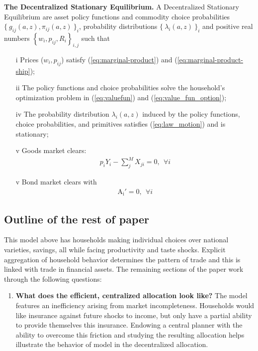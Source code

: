 \documentclass[12pt,pdftex]{article}
\begin{document}
\begin{onehalfspacing}
\textbf{The Decentralized Stationary Equilibrium.} A Decentralized Stationary Equilibrium are asset policy functions and commodity choice probabilities $\{\  g_{ij}(a, z), \pi_{ij}(a, z) \ \}_{i}$, probability distributions $\{ \ \lambda_i(a, z) \ \}_{i}$ and positive real numbers $\left \{w_i, p_{ij}, R_i\right \}_{i,j}$ such that
\begin{itemize}
\vspace{-.4cm}
\item[i]  Prices ($w_i, p_{ij}$) satisfy (\ref{eq:marginal-product}) and (\ref{eq:marginal-product-ship});
\item[ii] The policy functions and choice probabilities solve the household's optimization problem in (\ref{eq:valuefun}) and (\ref{eq:value_fun_option});
\item[iv] The probability distribution $\lambda_i(a, z)$ induced by the policy functions, choice probabilities, and primitives satisfies (\ref{eq:law_motion}) and is stationary;
\item[v] Goods market clears:
\begin{align}
p_{i} Y_{i} - \sum_{j}^{M}  X_{ji} = 0, \ \ \forall i
\end{align}
\item[v] Bond market clears with
\begin{align}
\mathrm{A_i'} = 0, \ \ \forall i
\label{eq:fa-condition}
\end{align}
\end{itemize}

\subsection{Outline of the rest of paper}

This model above has households making individual choices over national varieties, savings, all while facing productivity and taste shocks. Explicit aggregation of household behavior determines the pattern of trade and this is linked with trade in financial assets.  The remaining sections of the paper work through the following questions:
\begin{enumerate}
\item \textbf{What does the efficient, centralized allocation look like?} The model features an inefficiency arising from market incompleteness. Households would like insurance against future shocks to income, but only have a partial ability to provide themselves this insurance. Endowing a central planner with the ability to overcome this friction and studying the resulting allocation helps illustrate the behavior of model in the decentralized allocation.


\end{enumerate}
\end{onehalfspacing}
\end{document}
